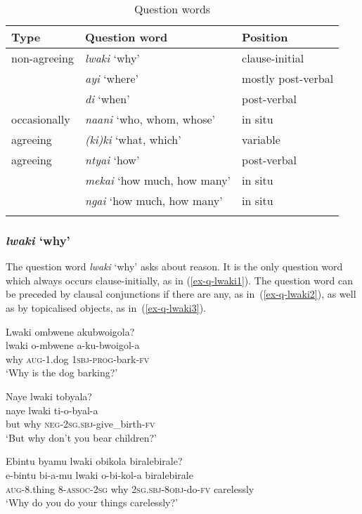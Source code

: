 \begin{table}
\caption{Question words}
\label{tab-question-words}
	\begin{tabular}{lll}
\lsptoprule

Type  & Question word & Position\\
\midrule
non-agreeing & \emph{lwaki} `why' & clause-initial\\
 & \emph{ayi} `where' & mostly post-verbal\\
 & \emph{di}  `when' & post-verbal\\
 \midrule
occasionally   & \emph{naani} `who, whom, whose' & in situ\\
agreeing & \emph{(ki)ki} `what, which' &  variable\\
 \midrule
agreeing  & \emph{ntyai} `how' & post-verbal\\
 & \emph{mekai} `how much, how many' & in situ\\
 & \emph{ngai}  `how much, how many' & in situ\\
 \lspbottomrule
 	\end{tabular}
 \end{table}

\subsubsection{\emph{lwaki} `why'} 
The question word \emph{lwaki} `why' asks about reason. 
It is the only question word which always occurs clause-initially, as in (\ref{ex-q-lwaki1}).
The question word can be preceded by clausal conjunctions if there are any, as in~(\ref{ex-q-lwaki2}), as well as by topicalised objects, as in~(\ref{ex-q-lwaki3}).

\ea \label{ex-q-lwaki}
\begin{xlist}
\ex \label{ex-q-lwaki1}
	\glll Lwaki ombwene akubwoigola?\\
	 lwaki o-mbwene a-ku-bwoigol-a\\
		why \textsc{aug}-1.dog \textsc{1sbj}-\textsc{prog}-bark-\textsc{fv}\\
	\glt ‘Why is the dog barking?'

\ex	\label{ex-q-lwaki2}
	\glll Naye lwaki tobyala?\\
		naye lwaki ti-o-byal-a\\
	but why \textsc{neg}-2\textsc{sg.sbj}-give\_birth-\textsc{fv}\\
	\glt ‘But why don’t you bear children?'

\ex	\label{ex-q-lwaki3}
	\glll Ebintu { }  byamu { } lwaki { } obikola { } biralebirale?\\
	  e-bintu { }  bi-a-mu { } lwaki { } o-bi-kol-a { }  biralebirale\\
		\textsc{aug}-8.thing { }  8-\textsc{assoc}-2\textsc{sg} { } why { } 2\textsc{sg.sbj}-\textsc{8obj}-do-\textsc{fv} { }  carelessly\\
\glt ‘Why do you do your things carelessly?'
\end{xlist}
\z

